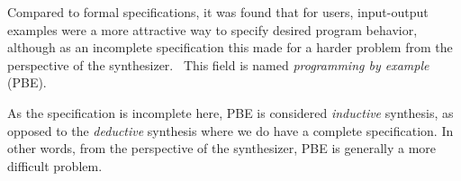 \documentclass{article}
\begin{document}





Compared to formal specifications, it was found that for users,
input-output examples were a more attractive way to specify desired program behavior,
although as an incomplete specification this made for a harder problem from the perspective of the synthesizer.~\citep{bodik2013algorithmic}
This field is named \emph{programming by example} (PBE).

As the specification is incomplete here, PBE is considered \emph{inductive} synthesis, as opposed to the \emph{deductive} synthesis where we do have a complete specification.
In other words, from the perspective of the synthesizer, PBE is generally a more difficult problem.
\end{document}
